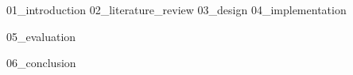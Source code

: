 \documentclass[12pt,oneside,a4paper]{book}
\begin{document}




\tableofcontents


\listoftables
\listoffigures


\pagebreak


\pagebreak

\newpage{}
\setcounter{page}{1}
 {01_introduction}
 {02_literature_review}
 {03_design}
 {04_implementation}

 {05_evaluation}

 {06_conclusion}

\renewcommand\bibname{References}


\clearpage
\printglossary[type=\acronymtype]
\printglossary
\clearpage
\end{document}
